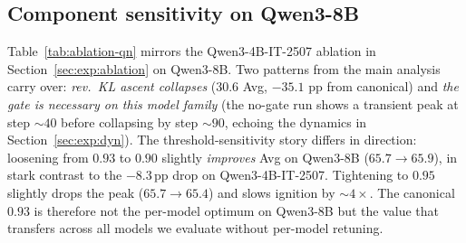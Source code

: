 \documentclass{llmxive}
\begin{document}
\subsection{Component sensitivity on Qwen3-8B}
\label{app:ablation-qn}

Table~\ref{tab:ablation-qn} mirrors the Qwen3-4B-IT-2507 ablation in Section~\ref{sec:exp:ablation} on Qwen3-8B. Two patterns from the main analysis carry over: \emph{rev.\ KL ascent collapses} ($30.6$ Avg, $-35.1$ pp from canonical) and \emph{the gate is necessary on this model family} (the no-gate run shows a transient peak at step $\sim 40$ before collapsing by step $\sim 90$, echoing the dynamics in Section~\ref{sec:exp:dyn}). The threshold-sensitivity story differs in direction: loosening from $0.93$ to $0.90$ slightly \emph{improves} Avg on Qwen3-8B ($65.7 \to 65.9$), in stark contrast to the $-8.3$\,pp drop on Qwen3-4B-IT-2507. Tightening to $0.95$ slightly drops the peak ($65.7 \to 65.4$) and slows ignition by $\sim 4\times$. The canonical $0.93$ is therefore not the per-model optimum on Qwen3-8B but the value that transfers across all models we evaluate without per-model retuning.
\end{document}
